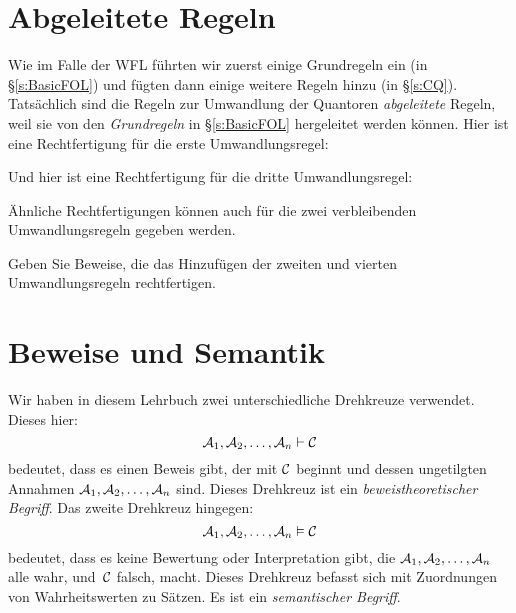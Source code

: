 \chapter{Abgeleitete Regeln}\label{s:DerivedFOL}
Wie im Falle der WFL führten wir zuerst einige Grundregeln ein (in \S\ref{s:BasicFOL}) und fügten dann einige weitere Regeln hinzu (in \S\ref{s:CQ}). Tatsächlich sind die Regeln zur Umwandlung der Quantoren \emph{abgeleitete} Regeln, weil sie von den \emph{Grundregeln} in \S\ref{s:BasicFOL} hergeleitet werden können. Hier ist eine Rechtfertigung für die erste Umwandlungsregel:
\begin{fitchproof}
	\open
		\open
		\close
	\close
\end{fitchproof}
Und hier ist eine Rechtfertigung für die dritte Umwandlungsregel:
\begin{fitchproof}
	\open
		\open
		\close
	\close
\end{fitchproof}
Ähnliche Rechtfertigungen können auch für die zwei verbleibenden Umwandlungsregeln gegeben werden.

\practiceproblems

\problempart
Geben Sie Beweise, die das Hinzufügen der zweiten und vierten Umwandlungsregeln rechtfertigen.



\chapter{Beweise und Semantik}
Wir haben in diesem Lehrbuch zwei unterschiedliche Drehkreuze verwendet. Dieses hier:
$$\mathcal{A}_1, \mathcal{A}_2, \ldots, \mathcal{A}_n \vdash \mathcal{C}$$
bedeutet, dass es einen Beweis gibt, der mit $\mathcal{C}$ beginnt und dessen ungetilgten Annahmen $\mathcal{A}_1, \mathcal{A}_2, \ldots, \mathcal{A}_n$ sind. Dieses Drehkreuz ist ein \emph{beweistheoretischer Begriff}. Das zweite Drehkreuz hingegen: 
$$\mathcal{A}_1, \mathcal{A}_2, \ldots, \mathcal{A}_n \vDash \mathcal{C}$$
bedeutet, dass es keine Bewertung oder Interpretation gibt, die $\mathcal{A}_1, \mathcal{A}_2, \ldots, \mathcal{A}_n$ alle wahr, und~$\mathcal{C}$ falsch, macht. Dieses Drehkreuz befasst sich mit Zuordnungen von Wahrheitswerten zu Sätzen. Es ist ein \emph{semantischer Begriff}.

